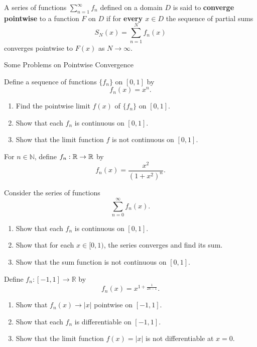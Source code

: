 \documentclass[12pt, a4paper]{article}
\begin{document}
\clearpage

\begin{definition}
    A series of functions $\sum_{n=1}^{\infty} f_n$ defined on a domain $D$ is said to \textbf{converge pointwise} to a function $F$ on $D$ if for \textbf{every $x \in D$} the sequence of partial sums
    \[
    S_N(x) = \sum_{n=1}^{N} f_n(x)
    \]
converges pointwise to $F(x)$ as $N \to \infty$.
\end{definition}

\clearpage

\begin{heading}
    Some Problems on Pointwise Convergence
\end{heading}

\begin{problem}
    Define a sequence of functions $\{f_n\}$ on $[0,1]$ by
    \[
    f_n(x) = x^n.
    \]
    \begin{enumerate}
        \item Find the pointwise limit $f(x)$ of $\{f_n\}$ on $[0,1]$.
        \item Show that each $f_n$ is continuous on $[0,1]$.
        \item Show that the limit function $f$ is not continuous on $[0,1]$.
    \end{enumerate}
\end{problem}

\clearpage

\begin{problem}
For $n\in\mathbb{N}$, define $f_n:\mathbb{R}\to\mathbb{R}$ by
\[
f_n(x)=\frac{x^2}{(1+x^2)^n}.
\]

Consider the series of functions
\[
\sum_{n=0}^{\infty} f_n(x).
\]

\begin{enumerate}
\item Show that each $f_n$ is continuous on $[0,1]$.
\item Show that for each $x\in[0,1)$, the series converges and find its sum.
\item Show that the sum function is not continuous on $[0,1]$.
\end{enumerate}
\end{problem}

\clearpage

\begin{problem}
Define $f_n:[-1,1]\to\mathbb{R}$ by
\[
f_n(x) = x^{1+\frac{1}{2n-1}}.
\]
\begin{enumerate}
\item Show that $f_n(x)\to |x|$ pointwise on $[-1,1]$.
\item Show that each $f_n$ is differentiable on $[-1,1]$.
\item Show that the limit function $f(x)=|x|$ is not differentiable at $x=0$.
\end{enumerate}
\end{problem}
\end{document}
